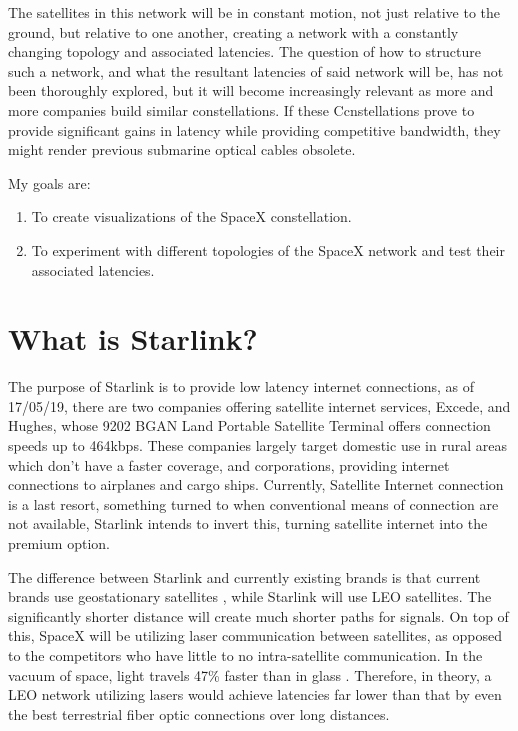 \documentclass[12pt,a4paper,twoside,openright]{report}
\begin{document}
The satellites in this network will be in constant motion, not just relative to the ground, but relative to one another, creating a network with a constantly changing topology and associated latencies. The question of how to structure such a network, and what the resultant latencies of said network will be, has not been thoroughly explored, but it will become increasingly relevant as more and more companies build similar constellations. If these Ccnstellations prove to provide significant gains in latency while providing competitive bandwidth, they might render previous submarine optical cables obsolete.

My goals are:
\begin{enumerate}
	\item To create visualizations of the SpaceX constellation.
	\item To experiment with different topologies of the SpaceX network and test their associated latencies. 
\end{enumerate}

\section{What is Starlink?}

The purpose of Starlink is to provide low latency internet connections, as of 17/05/19, there are two companies offering satellite internet services, Excede\cite{ExcedeWebsite}, and Hughes, whose 9202 BGAN Land Portable Satellite Terminal offers connection speeds up to 464kbps\cite{HughesWebsite}. These companies largely target domestic use in rural areas which don’t have a faster coverage, and corporations, providing internet connections to airplanes and cargo ships. Currently, Satellite Internet connection is a last resort, something turned to when conventional means of connection are not available, Starlink intends to invert this, turning satellite internet into the premium option. 

The difference between Starlink and currently existing brands is that current brands use geostationary satellites \cite{HughesPressRelease}, while Starlink will use LEO satellites. The significantly shorter distance will create much shorter paths for signals. On top of this, SpaceX will be utilizing laser communication between satellites, as opposed to the competitors who have little to no intra-satellite communication. In the vacuum of space, light travels 47\% faster than in glass \cite{PropertiesOfGlass}. Therefore, in theory, a LEO network utilizing lasers would achieve latencies far lower than that by even the best terrestrial fiber optic connections over long distances.
\end{document}
